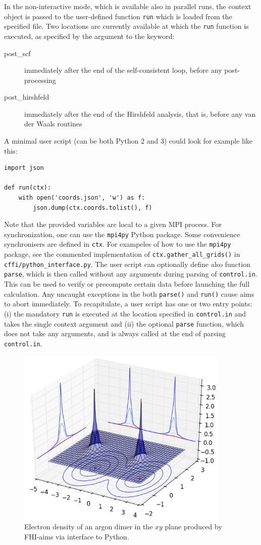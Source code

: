 In the non-interactive mode, which is available also in parallel runs, the
context object is passed to the user-defined function \verb+run+ which is
loaded from the specified file.
Two locations are currently available at which the \verb+run+ function is executed, as specified by the argument to the  keyword:
\begin{description}
  \item[post\_scf] immediately after the end of the self-consistent loop, before any post-processing
  \item[post\_hirshfeld] immediately after the end of the Hirshfeld analysis, that is, before any van der Waals routines
\end{description}
A minimal user script (can be both Python 2 and 3) could look for example like
this:
\begin{verbatim}
import json

def run(ctx):
    with open('coords.json', 'w') as f:
        json.dump(ctx.coords.tolist(), f)
\end{verbatim}
Note that the provided variables are local to a given MPI process.
For synchronization, one can use the \verb+mpi4py+ Python package.
Some convenience synchronisers are defined in \verb+ctx+.
For exampeles of how to use the \verb+mpi4py+ package, see the commented
implementation of \verb+ctx.gather_all_grids()+ in \verb+cffi/python_interface.py+.
The user script can optionally define also function \verb+parse+, which is then
called without any arguments during parsing of \verb+control.in+.
This can be used to verify or precompute certain data before launching the full
calculation.
Any uncaught exceptions in the both \verb+parse()+ and \verb+run()+ cause aims
to abort immediately.
To recapitulate, a user script has one or two entry points: (i) the mandatory \verb+run+ is executed at the location specified in \verb+control.in+ and takes the single context argument and (ii) the optional \verb+parse+ function, which does not take any arguments, and is always called at the end of parsing \verb+control.in+.

\begin{figure}
    \centering
    \includegraphics[width=4in]{electron-density-argon-dimer.png}
    \caption{
      Electron density of an argon dimer in the $xy$ plane produced by FHI-aims
      via interface to Python.
    }\label{fig:density-ar2}
\end{figure}

